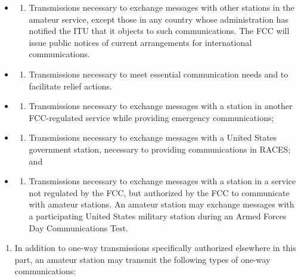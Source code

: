 \documentclass[
  letterpaper,
  DIV=11,
  numbers=noendperiod]{scrreport}
\providecommand{\tightlist}{%
  \setlength{\itemsep}{0pt}\setlength{\parskip}{0pt}}\usepackage{longtable,booktabs,array}
\begin{document}
\begin{itemize}
\item
  \begin{enumerate}
  \def\labelenumi{(\arabic{enumi})}
  \tightlist
  \item
    Transmissions necessary to exchange messages with other stations in
    the amateur service, except those in any country whose
    administration has notified the ITU that it objects to such
    communications. The FCC will issue public notices of current
    arrangements for international communications.
  \end{enumerate}
\item
  \begin{enumerate}
  \def\labelenumi{(\arabic{enumi})}
  \setcounter{enumi}{1}
  \tightlist
  \item
    Transmissions necessary to meet essential communication needs and to
    facilitate relief actions.
  \end{enumerate}
\item
  \begin{enumerate}
  \def\labelenumi{(\arabic{enumi})}
  \setcounter{enumi}{2}
  \tightlist
  \item
    Transmissions necessary to exchange messages with a station in
    another FCC-regulated service while providing emergency
    communications;
  \end{enumerate}
\item
  \begin{enumerate}
  \def\labelenumi{(\arabic{enumi})}
  \setcounter{enumi}{3}
  \tightlist
  \item
    Transmissions necessary to exchange messages with a United States
    government station, necessary to providing communications in RACES;
    and
  \end{enumerate}
\item
  \begin{enumerate}
  \def\labelenumi{(\arabic{enumi})}
  \setcounter{enumi}{4}
  \tightlist
  \item
    Transmissions necessary to exchange messages with a station in a
    service not regulated by the FCC, but authorized by the FCC to
    communicate with amateur stations. An amateur station may exchange
    messages with a participating United States military station during
    an Armed Forces Day Communications Test.
  \end{enumerate}
\end{itemize}

\begin{enumerate}
\def\labelenumi{(\alph{enumi})}
\setcounter{enumi}{1}
\tightlist
\item
  In addition to one-way transmissions specifically authorized elsewhere
  in this part, an amateur station may transmit the following types of
  one-way communications:
\end{enumerate}
\end{document}
